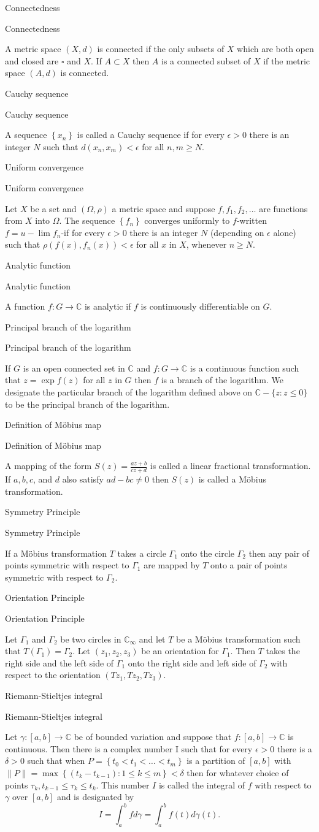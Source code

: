 \documentclass[17pt]{extarticle}
\newcommand{\C}{\mathbb{C}}
\newcommand{\boxset}[2]{\begin{mdframed}[style=darkQuesion]
  #1
    \end{mdframed}
    \newpage
    \begin{mdframed}[style=darkQuesion]
      #1
        \end{mdframed}
    \begin{mdframed}[style=darkAnswer]
      #2
        \end{mdframed}
        \newpage
  }
\begin{document}
\par
\newpage
\boxset{Connectedness}
{ A metric space $(X, d)$ is connected if the only subsets of $X$ which are both open and closed are $\square$ and $X$. If $A \subset X$ then $A$ is a connected subset of $X$ if the metric space $(A, d)$ is connected.}
\boxset{Cauchy sequence}
{ A sequence $\left\{x_{n}\right\}$ is called a Cauchy sequence if for every $\epsilon>0$ there is an integer $N$ such that $d\left(x_{n}, x_{m}\right)<\epsilon$ for all $n, m \geq N$.}
\boxset{Uniform convergence}
{Let $X$ be a set and $(\Omega, \rho)$ a metric space and suppose $f, f_{1}, f_{2}, \ldots$ are functions from $X$ into $\Omega$. The sequence $\left\{f_{n}\right\}$ converges uniformly to $f$-written $f=u-\lim f_{n}$-if for every $\epsilon>0$ there is an integer $N$ (depending on $\epsilon$ alone) such that $\rho\left(f(x), f_{n}(x)\right)<\epsilon$ for all $x$ in $X$, whenever $n \geq N$.}
\boxset{Analytic function}
{ A function $f: G \rightarrow \C$ is analytic if $f$ is continuously differentiable on $G$.}
\boxset{Principal branch of the logarithm}
{ If $G$ is an open connected set in $\C$ and $f: G \rightarrow \C$ is a continuous function such that $z=\exp f(z)$ for all $z$ in $G$ then $f$ is a branch of the logarithm.
We designate the particular branch of the logarithm defined above on $\C-\{z: z \leq 0\}$ to be the principal branch of the logarithm.}
\boxset{Definition of Möbius map}
{ A mapping of the form $S(z)=\frac{a z+b}{c z+d}$ is called a linear fractional transformation. If $a, b, c$, and $d$ also satisfy $a d-b c \neq 0$ then $S(z)$ is called a Möbius transformation.}
\boxset{Symmetry Principle}
{ If a Möbius transformation $T$ takes a circle $\Gamma_{1}$ onto the circle $\Gamma_{2}$ then any pair of points symmetric with respect to $\Gamma_{1}$ are mapped by $T$ onto a pair of points symmetric with respect to $\Gamma_{2}$.}
\boxset{Orientation Principle}
{ Let $\Gamma_{1}$ and $\Gamma_{2}$ be two circles in $\C_{\infty}$ and let $T$ be a Möbius transformation such that $T\left(\Gamma_{1}\right)=\Gamma_{2}$. Let $\left(z_{1}, z_{2}, z_{3}\right)$ be an orientation for $\Gamma_{1}$. Then $T$ takes the right side and the left side of $\Gamma_{1}$ onto the right side and left side of $\Gamma_{2}$ with respect to the orientation $\left(T z_{1}, T z_{2}, T z_{3}\right)$.}
\boxset{Riemann-Stieltjes integral}
{ Let $\gamma:[a, b] \rightarrow \C$ be of bounded variation and suppose that $f:[a, b] \rightarrow \C$ is continuous. Then there is a complex number I such that for every $\epsilon>0$ there is a $\delta>0$ such that when $P=\left\{t_{0}<t_{1}<\ldots<t_{m}\right\}$ is a partition of $[a, b]$ with $\|P\|=\max \left\{\left(t_{k}-t_{k-1}\right): 1 \leq k \leq m\right\}<\delta$ then
for whatever choice of points $\tau_{k}, t_{k-1} \leq \tau_{k} \leq t_{k}$.
This number $I$ is called the integral of $f$ with respect to $\gamma$ over $[a, b]$ and is designated by
\[I=\int_{a}^{b} f d \gamma=\int_{a}^{b} f(t) d \gamma(t) .\]
}
\end{document}
